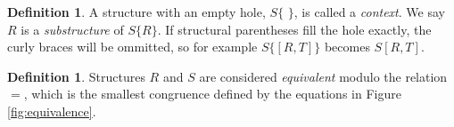 \documentclass[11pt, oneside]{article}
\theoremstyle{plain}
\theoremstyle{definition}
\newtheorem{definition}[theorem]{Definition}
\begin{document}
\begin{definition}
A structure with an empty hole, $S\{\,\,\}$, is called a \textit{context}.
We say $R$ is a \textit{substructure} of $S\{R\}$.
If structural parentheses fill the hole exactly, the curly braces will be ommitted, so for example $S\{[R,T]\}$ becomes $S[R,T]$.
\end{definition}

\begin{definition}
Structures $R$ and $S$ are considered \textit{equivalent} modulo the relation $=$, which is the smallest congruence defined by the equations in Figure \ref{fig:equivalence}.
\end{definition}

\begin{figure}[ht!]
    \centering
    \setlength{\fboxsep}{5pt} %
    \setlength{\fboxrule}{0.5pt} %
\end{figure}
\end{document}
